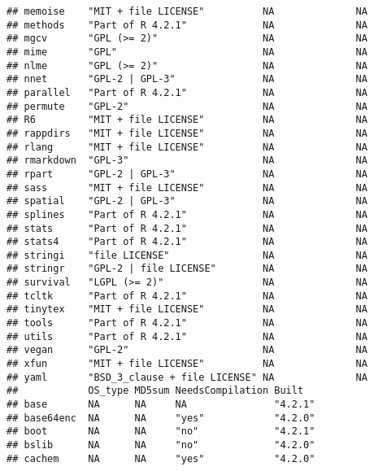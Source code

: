 \documentclass[
]{article}
\begin{document}
\begin{verbatim}
## memoise    "MIT + file LICENSE"          NA              NA                   
## methods    "Part of R 4.2.1"             NA              NA                   
## mgcv       "GPL (>= 2)"                  NA              NA                   
## mime       "GPL"                         NA              NA                   
## nlme       "GPL (>= 2)"                  NA              NA                   
## nnet       "GPL-2 | GPL-3"               NA              NA                   
## parallel   "Part of R 4.2.1"             NA              NA                   
## permute    "GPL-2"                       NA              NA                   
## R6         "MIT + file LICENSE"          NA              NA                   
## rappdirs   "MIT + file LICENSE"          NA              NA                   
## rlang      "MIT + file LICENSE"          NA              NA                   
## rmarkdown  "GPL-3"                       NA              NA                   
## rpart      "GPL-2 | GPL-3"               NA              NA                   
## sass       "MIT + file LICENSE"          NA              NA                   
## spatial    "GPL-2 | GPL-3"               NA              NA                   
## splines    "Part of R 4.2.1"             NA              NA                   
## stats      "Part of R 4.2.1"             NA              NA                   
## stats4     "Part of R 4.2.1"             NA              NA                   
## stringi    "file LICENSE"                NA              NA                   
## stringr    "GPL-2 | file LICENSE"        NA              NA                   
## survival   "LGPL (>= 2)"                 NA              NA                   
## tcltk      "Part of R 4.2.1"             NA              NA                   
## tinytex    "MIT + file LICENSE"          NA              NA                   
## tools      "Part of R 4.2.1"             NA              NA                   
## utils      "Part of R 4.2.1"             NA              NA                   
## vegan      "GPL-2"                       NA              NA                   
## xfun       "MIT + file LICENSE"          NA              NA                   
## yaml       "BSD_3_clause + file LICENSE" NA              NA                   
##            OS_type MD5sum NeedsCompilation Built  
## base       NA      NA     NA               "4.2.1"
## base64enc  NA      NA     "yes"            "4.2.0"
## boot       NA      NA     "no"             "4.2.1"
## bslib      NA      NA     "no"             "4.2.0"
## cachem     NA      NA     "yes"            "4.2.0"

\end{verbatim}
\end{document}
